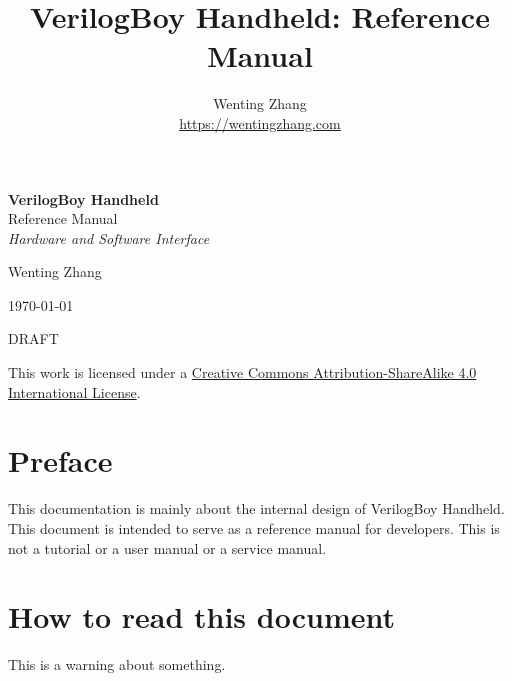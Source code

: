 \documentclass[a4paper, draft, oneside]{memoir}
\title{VerilogBoy Handheld: Reference Manual}
\author{Wenting Zhang\\ \url{https://wentingzhang.com}}
\begin{document}
\hypersetup{pageanchor=false}

\begin{titlingpage}
	\vspace*{\baselineskip} %
	\vspace*{0.167\textheight} %
	{\textbf{\LARGE VerilogBoy Handheld}}\\[\baselineskip] %
	{\Huge Reference Manual}\\[\baselineskip] %
  {\Large \textit{Hardware and Software Interface}} %
  \vspace*{0.167\textheight}\par
  {\Large Wenting Zhang\par} %
  {\large \today\par}
	\vfill %
  \ifdraftdoc
    DRAFT\par
  \fi
  \href{http://creativecommons.org/licenses/by-sa/4.0/}{\Huge \ccbysa}\par
  This work is licensed under a \href{http://creativecommons.org/licenses/by-sa/4.0/}{Creative Commons Attribution-ShareAlike 4.0 International License}.
  \vspace*{3\baselineskip} %
\end{titlingpage}

\hypersetup{pageanchor=true}

\chapter*{Preface}

This documentation is mainly about the internal design of VerilogBoy Handheld. This document is intended to serve as a reference manual for developers. This is not a tutorial or a user manual or a service manual.

\chapter*{How to read this document}

\begin{warning}
  This is a warning about something.
\end{warning}
\end{document}
